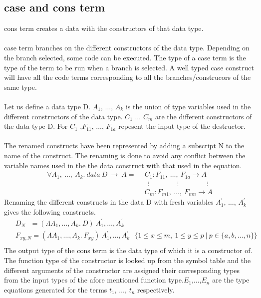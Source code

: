 \documentclass[11pt]{article}
\begin{document}
\subsection {case and cons term}
{\sf cons } term creates a data with the constructors of that data type.
~~\\~~\\
{\sf case} term branches on the different constructors of the data type. Depending on the branch selected, some code can be executed. The type of a case term is the type of the term to be run when a branch is selected. A well typed case construct will have all the code terms corresponding to all the branches/construcors of the same type.
~~\\~~\\
Let us define a data type D. $A_1$, $\ldots$, $A_k$ is the union of type variables used in the different constructors of the data type. $C_1$ $\ldots$ $C_m$ are the different constructors of the data type D. For $C_1$ ,$F_{11}$, $\ldots$, $F_{1a}$ repesent the input type of the destructor.
~~\\~~\\
The renamed constructs have been represented by adding a subscript N to the name of the construct. The renaming is done to avoid any conflict between the variable names used in the the data construct with that used in the equation. 
\begin{align*} 
\forall A_1,~ \ldots,~A_k.~data~ D ~\to~ A =
 & ~~ C_1 : F_{11},~ \ldots, ~ F_{1a} \to A \\
 & ~~~~ \vdots \qquad\qquad \vdots \qquad\qquad \vdots \\ 
 & ~~ C_m : F_{m1} ,~ \ldots, ~ F_{mn} \to A
\end{align*}
Renaming the different constructs in the data D with fresh variables $A_1^{\prime}$, $\ldots$, $A_k^{\prime}$ gives the following constructs. 
\begin{align*}
 & ~~ D_{N} ~~~ = (\Lambda A_1,\ldots,A_k.~ D)~A_1^{\prime},\ldots,A_k^{\prime}\\ 
 & ~~ F_{xy,N} = (\Lambda A_1,\ldots,A_k.~F_{xy})~A_1^{\prime},\ldots,A_k^{\prime} 
 ~~~  \{1 \leq x \leq m,~1 \leq y \leq p ~|~ p \in \{a,b,\ldots,n\} \} \\
 \end{align*}
The output type of the {\sf cons} term is the data type of which it is a constructor of. The function type of the constructor is looked up from the symbol table and the different arguments of the constructor are assigned their corresponding types from the input types of the afore mentioned function type.$E_1$,$\ldots$,$E_n$ are the type equations generated for the terms $t_1$, $\ldots$, $t_n$ respectively.
\end{document}

